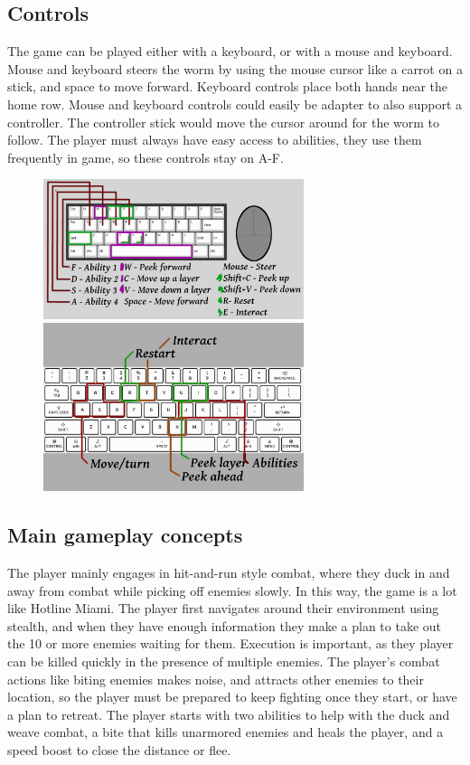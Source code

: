 \documentclass[12pt]{report}
\begin{document}
\subsection*{Controls}
The game can be played either with a keyboard, or with a mouse and keyboard.
Mouse and keyboard steers the worm by using the mouse cursor like a carrot on
a stick, and space to move forward. Keyboard controls place both hands near the
home row. Mouse and keyboard controls could easily be adapter to also support 
a controller. The controller stick would move the cursor around for the worm to
follow. The player must always have easy access to abilities, they use them 
frequently in game, so these controls stay on A-F.

\begin{figure}[ht]
    \centering
    \includegraphics[width=3in]{img/kb_60_mouse.png}
    \includegraphics[width=3in]{img/kb.png}
\end{figure}

\pagebreak
\subsection*{Main gameplay concepts}
The player mainly engages in hit-and-run style combat, where they duck in and
away from combat while picking off enemies slowly. In this way, the game is a lot
like Hotline Miami. The player first navigates around their environment using
stealth, and when they have enough information they make a plan to take out the
10 or more enemies waiting for them. Execution is important, as they player can
be killed quickly in the presence of multiple enemies. The player's combat actions
like biting enemies makes noise, and attracts other enemies to their location,
so the player must be prepared to keep fighting once they start, or have a plan
to retreat. The player starts with two abilities to help with the duck and weave combat,
a bite that kills unarmored enemies and heals the player, and a speed boost to close
the distance or flee.
\end{document}
